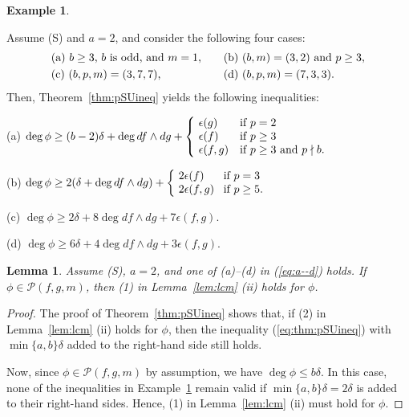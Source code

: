 \documentclass{amsart}
\theoremstyle{plain}
\newtheorem{lem}[thm]{Lemma}
\theoremstyle{definition}
\newtheorem{example}[thm]{Example}
\newcommand{\nd}{\noindent}
\newcommand{\ep}{\epsilon}
\begin{document}
\begin{example}\label{cor:nonsingular}\rm 


Assume (S) and $a=2$, 
and consider the following four cases: 
\begin{equation}\label{eq:a--d}
\begin{aligned}
&\text{\rm (a) 
$b\ge 3$, $b$ is odd, and $m=1$,}\quad & &
\text{\rm (b) $(b,m)=(3,2)$ and $p\ge 3$,} \\
&\text{\rm (c) $(b,p,m)=(3,7,7)$,} & &
\text{\rm (d) $(b,p,m)=(7,3,3)$}.
\end{aligned}
\end{equation}
Then, Theorem~\ref{thm:pSUineq} 
yields the following inequalities: 


\nd 
(a) $\deg \phi \ge (b-2)\delta +\deg df\wedge dg 
+\left\{ \!
\begin{array}{ll}
\ep (g)& \text{\rm if $p=2$}\\
\ep (f)& \text{\rm if $p\ge 3$}\\
\ep (f,g)& \text{\rm if $p\ge 3$ and $p\nmid b$}. 
\end{array}
\right.$


\nd 
(b) $\deg \phi\ge 2(\delta +\deg df\wedge dg)
+\left\{ \!
\begin{array}{ll}
2\ep (f)& \! \text{\rm if $p=3$}\\
2\ep (f,g)& \! \text{\rm if $p\ge 5$}. 
\end{array}
\right.$

\nd 
(c) $\deg \phi\ge 2\delta +8\deg df\wedge dg+7\ep (f,g)$. 


\nd 
(d) $\deg \phi\ge 6\delta +4\deg df\wedge dg+3\ep (f,g)$. 
\end{example}


\begin{lem}\label{lem:nonsingular}
Assume {\rm (S)}, 
$a=2$, 
and one of {\rm (a)}--{\rm (d)} in {\rm (\ref{eq:a--d})} holds. 
If $\phi \in \mathcal{P}(f,g,m)$, 
then {\rm (1)} in Lemma~{\rm \ref{lem:lcm} (ii)} holds for $\phi $. 
\end{lem}


\begin{proof}
The proof of Theorem~\ref{thm:pSUineq} shows that, 
if (2) in Lemma~\ref{lem:lcm} (ii) holds for $\phi $, 
then the inequality (\ref{eq:thm:pSUineq}) 
with $\min \{ a,b\} \delta $ added to the right-hand side still holds. 


Now, 
since $\phi \in \mathcal{P}(f,g,m)$ by assumption, 
we have $\deg \phi \le b\delta $. 
In this case, 
none of the inequalities in Example~\ref{cor:nonsingular} 
remain valid if $\min \{ a,b\} \delta =2\delta $ 
is added to their right-hand sides. 
Hence, 
(1) in Lemma~\ref{lem:lcm} (ii) must hold for $\phi $. 
\end{proof}
\end{document}
